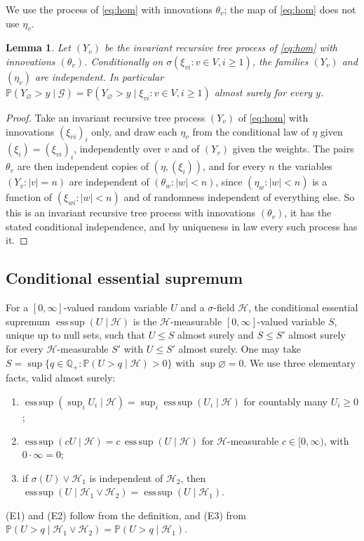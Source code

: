 \documentclass[11pt]{amsart}
\newtheorem{lemma}[theorem]{Lemma}
\theoremstyle{remark}
\newcommand{\Ga}{\mathcal{G}}
\newcommand{\cH}{\mathcal{H}}
\newcommand{\Q}{\mathbb{Q}}
\newcommand{\Pb}{\mathbb{P}}
\newcommand{\esssup}{\operatorname*{ess\,sup}}
\begin{document}
We use the process of \eqref{eq:hom} with innovations $\theta_v$; the map of \eqref{eq:hom}
does not use $\eta_v$.

\begin{lemma}\label{lem:eta}
Let $(Y_v)$ be the invariant recursive tree process of \eqref{eq:hom} with innovations
$(\theta_v)$. Conditionally on $\sigma(\xi_{vi}:v\in V,i\ge1)$, the families $(Y_v)$ and
$(\eta_v)$ are independent. In particular
$\Pb(Y_\varnothing>y\mid\Ga)=\Pb(Y_\varnothing>y\mid \xi_{vi}: v\in V, i\ge 1)$ almost
surely for every $y$.
\end{lemma}

\begin{proof}
Take an invariant recursive tree process $(Y_v)$ of \eqref{eq:hom} with innovations
$(\xi_{vi})_i$ only, and draw each $\eta_v$ from the conditional law of $\eta$ given
$(\xi_i)=(\xi_{vi})_i$, independently over $v$ and of $(Y_v)$ given the weights. The
pairs $\theta_v$ are then independent copies of $(\eta,(\xi_i))$, and for every $n$ the
variables $(Y_v:|v|=n)$ are independent of $(\theta_w:|w|<n)$, since $(\eta_w:|w|<n)$ is a
function of $(\xi_{wi}:|w|<n)$ and of randomness independent of everything else. So this
is an invariant recursive tree process with innovations $(\theta_v)$, it has the stated
conditional independence, and by uniqueness in law every such process has it.
\end{proof}

\subsection{Conditional essential supremum}
For a $[0,\infty]$-valued random variable $U$ and a $\sigma$-field $\cH$, the conditional
essential supremum $\esssup(U\mid\cH)$ is the $\cH$-measurable $[0,\infty]$-valued
variable $S$, unique up to null sets, such that $U\le S$ almost surely and $S\le S'$
almost surely for every $\cH$-measurable $S'$ with $U\le S'$ almost surely. One may take
$S=\sup\{q\in\Q_+:\Pb(U>q\mid\cH)>0\}$ with $\sup\varnothing=0$. We use three elementary
facts, valid almost surely:
\begin{enumerate}
\item[(E1)] $\esssup(\sup_i U_i\mid\cH)=\sup_i\esssup(U_i\mid\cH)$ for countably many
$U_i\ge0$;
\item[(E2)] $\esssup(cU\mid\cH)=c\,\esssup(U\mid\cH)$ for $\cH$-measurable
$c\in[0,\infty)$, with $0\cdot\infty=0$;
\item[(E3)] if $\sigma(U)\vee\cH_1$ is independent of $\cH_2$, then
$\esssup(U\mid\cH_1\vee\cH_2)=\esssup(U\mid\cH_1)$.
\end{enumerate}
(E1) and (E2) follow from the definition, and (E3) from
$\Pb(U>q\mid\cH_1\vee\cH_2)=\Pb(U>q\mid\cH_1)$.
\end{document}
